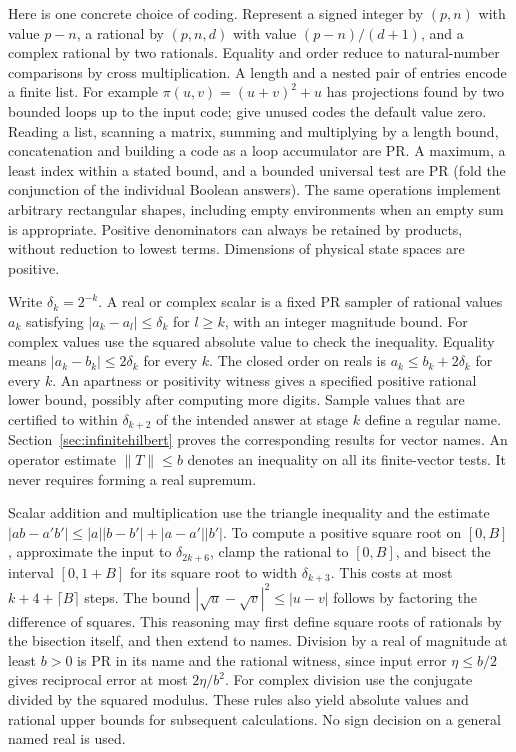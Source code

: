 Here is one concrete choice of coding. Represent a signed integer by $(p,n)$ with value $p-n$, a rational by $(p,n,d)$ with value $(p-n)/(d+1)$, and a complex rational by two rationals. Equality and order reduce to natural-number comparisons by cross multiplication. A length and a nested pair of entries encode a finite list. For example $\pi(u,v)=(u+v)^2+u$ has projections found by two bounded loops up to the input code; give unused codes the default value zero. Reading a list, scanning a matrix, summing and multiplying by a length bound, concatenation and building a code as a loop accumulator are PR. A maximum, a least index within a stated bound, and a bounded universal test are PR (fold the conjunction of the individual Boolean answers). The same operations implement arbitrary rectangular shapes, including empty environments when an empty sum is appropriate. Positive denominators can always be retained by products, without reduction to lowest terms. Dimensions of physical state spaces are positive.

Write $\delta_k=2^{-k}$. A real or complex scalar is a fixed PR sampler of rational values $a_k$ satisfying $|a_k-a_l|\le\delta_k$ for $l\ge k$, with an integer magnitude bound. For complex values use the squared absolute value to check the inequality. Equality means $|a_k-b_k|\le2\delta_k$ for every $k$. The closed order on reals is $a_k\le b_k+2\delta_k$ for every $k$. An apartness or positivity witness gives a specified positive rational lower bound, possibly after computing more digits. Sample values that are certified to within $\delta_{k+2}$ of the intended answer at stage $k$ define a regular name. Section~\ref{sec:infinitehilbert} proves the corresponding results for vector names. An operator estimate $\|T\|\le b$ denotes an inequality on all its finite-vector tests. It never requires forming a real supremum.

Scalar addition and multiplication use the triangle inequality and the estimate
$|ab-a'b'|\le |a||b-b'|+|a-a'||b'|$. To compute a positive square root on $[0,B]$, approximate the input to $\delta_{2k+6}$, clamp the rational to $[0,B]$, and bisect the interval $[0,1+B]$ for its square root to width $\delta_{k+3}$. This costs at most $k+4+\lceil B\rceil$ steps. The bound $|\sqrt u-\sqrt v|^2\le|u-v|$ follows by factoring the difference of squares. This reasoning may first define square roots of rationals by the bisection itself, and then extend to names. Division by a real of magnitude at least $b>0$ is PR in its name and the rational witness, since input error $\eta\le b/2$ gives reciprocal error at most $2\eta/b^2$. For complex division use the conjugate divided by the squared modulus. These rules also yield absolute values and rational upper bounds for subsequent calculations. No sign decision on a general named real is used.

